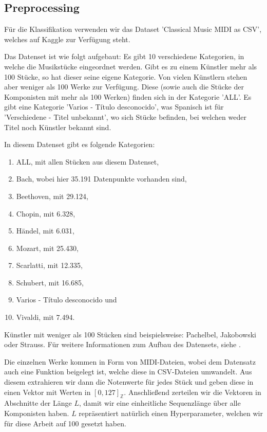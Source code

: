 


\subsection{Preprocessing}
Für die Klassifikation verwenden wir das Dataset 'Classical Music MIDI as CSV', welches auf Kaggle zur Verfügung steht. 

Das Datenset ist wie folgt aufgebaut: 
Es gibt 10 verschiedene Kategorien, in welche die Musikstücke eingeordnet werden.
Gibt es zu einem Künstler mehr als 100 Stücke, so hat dieser seine eigene Kategorie. Von vielen Künstlern stehen aber weniger als 100 Werke zur Verfügung. Diese (sowie auch die Stücke der Komponisten mit mehr als 100 Werken) finden sich
in der Kategorie 'ALL'. Es gibt eine Kategorie 'Varios - Título desconocido', was Spanisch ist für 'Verschiedene - Titel unbekannt', wo sich Stücke befinden, bei welchen weder Titel noch Künstler bekannt sind.

In diesem Datenset gibt es folgende Kategorien:

\begin{enumerate}[label = \textbf{\arabic*.}]
  \item ALL, mit allen Stücken aus diesem Datenset,
  \item Bach, wobei hier 35.191 Datenpunkte vorhanden sind,
  \item Beethoven, mit 29.124,
  \item Chopin, mit 6.328,
  \item Händel, mit 6.031,
  \item Mozart, mit 25.430,
  \item Scarlatti, mit 12.335,
  \item Schubert, mit 16.685,
  \item Varios - Título desconocido und
  \item Vivaldi, mit 7.494.
\end{enumerate}

Künstler mit weniger als 100 Stücken sind beispielsweise: Pachelbel, Jakobowski oder Strauss. 
Für weitere Informationen zum Aufbau des Datensets, siehe \parencite{Dataset}.

Die einzelnen Werke kommen in Form von MIDI-Dateien, wobei dem Datensatz auch eine Funktion beigelegt ist, welche
diese in CSV-Dateien umwandelt. Aus diesem extrahieren wir dann die Notenwerte für jedes Stück und geben diese in einen Vektor 
mit Werten in $[0, 127]_{\mathbb{Z}}$. Anschließend zerteilen wir die Vektoren in Abschnitte der Länge $L$, damit wir eine einheitliche 
Sequenzlänge über alle Komponisten haben. $L$ repräsentiert natürlich einen Hyperparameter, welchen wir für diese
Arbeit auf 100 gesetzt haben.

